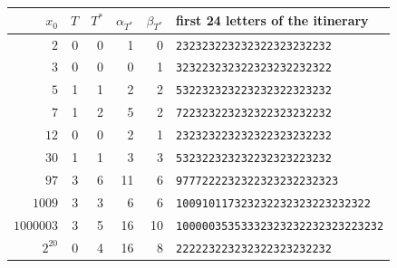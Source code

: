 \begin{tabular}{@{}rrrrrl@{}}\toprule
$x_0$ & $T$ & $T^*$ & $\alpha_{T^*}$ & $\beta_{T^*}$ & first 24 letters of the itinerary\\\midrule
$2$ & 0 & 0 & 1 & 0 & \texttt{232323223232322323232232} \\
$3$ & 0 & 0 & 0 & 1 & \texttt{323223232322323232232322} \\
$5$ & 1 & 1 & 2 & 2 & \texttt{532232323223232322323232} \\
$7$ & 1 & 2 & 5 & 2 & \texttt{722323223232322323232232} \\
$12$ & 0 & 0 & 2 & 1 & \texttt{232323223232322323232232} \\
$30$ & 1 & 1 & 3 & 3 & \texttt{532322323232232323223232} \\
$97$ & 3 & 6 & 11 & 6 & \texttt{9777222232322323232232323} \\
$1009$ & 3 & 3 & 6 & 6 & \texttt{100910117323232232323223232322} \\
$1000003$ & 3 & 5 & 16 & 10 & \texttt{10000035353332323232232323223232} \\
$2^{20}$ & 0 & 4 & 16 & 8 & \texttt{222223223232322323232232} \\
\bottomrule\end{tabular}
